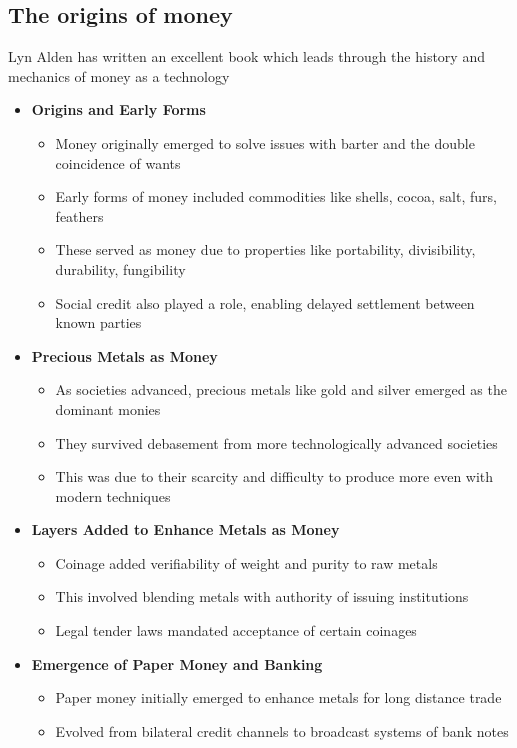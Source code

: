 \subsection{The origins of money}
Lyn Alden has written an excellent book which leads through the history and mechanics of money as a technology \cite{Alden2023}
\begin{itemize}
\item \textbf{Origins and Early Forms}
\begin{itemize}
\item Money originally emerged to solve issues with barter and the double coincidence of wants
\item Early forms of money included commodities like shells, cocoa, salt, furs, feathers
\item These served as money due to properties like portability, divisibility, durability, fungibility
\item Social credit also played a role, enabling delayed settlement between known parties
\end{itemize}
\item \textbf{Precious Metals as Money}
\begin{itemize}
\item As societies advanced, precious metals like gold and silver emerged as the dominant monies
\item They survived debasement from more technologically advanced societies
\item This was due to their scarcity and difficulty to produce more even with modern techniques
\end{itemize}
\item \textbf{Layers Added to Enhance Metals as Money}
\begin{itemize}
\item Coinage added verifiability of weight and purity to raw metals
\item This involved blending metals with authority of issuing institutions
\item Legal tender laws mandated acceptance of certain coinages
\end{itemize}
\item \textbf{Emergence of Paper Money and Banking}
\begin{itemize}
\item Paper money initially emerged to enhance metals for long distance trade
\item Evolved from bilateral credit channels to broadcast systems of bank notes

\end{itemize}
\end{itemize}
